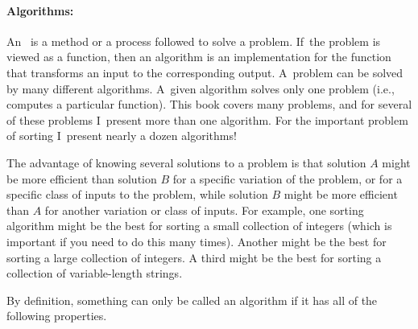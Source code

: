 \paragraph{Algorithms:}

An~ is a method or a process followed to
solve a problem.
If~the problem is viewed as a function, then an algorithm is an
implementation for the function
that transforms an input to the corresponding output.
A~problem can be solved by many different algorithms.
A~given algorithm solves only one
problem (i.e., computes a particular function).
This book covers many problems, and for several of these
problems I~present more than one algorithm.
For the important problem of sorting I~present nearly
a dozen algorithms!

The advantage of knowing several solutions to a problem is that
solution \(A\) might be more efficient than solution \(B\) for a
specific variation of the problem, or for a specific class of inputs
to the problem, while solution \(B\) might be more efficient than
\(A\) for another variation or class of inputs.
For example, one sorting algorithm might be the best
for sorting a small collection of integers (which is important if you
need to do this many times).
Another might be the best for sorting a large collection of integers.
A third might be the best for sorting a collection of variable-length
strings.

By definition, something can only be called an algorithm if it has all
of the following properties.

